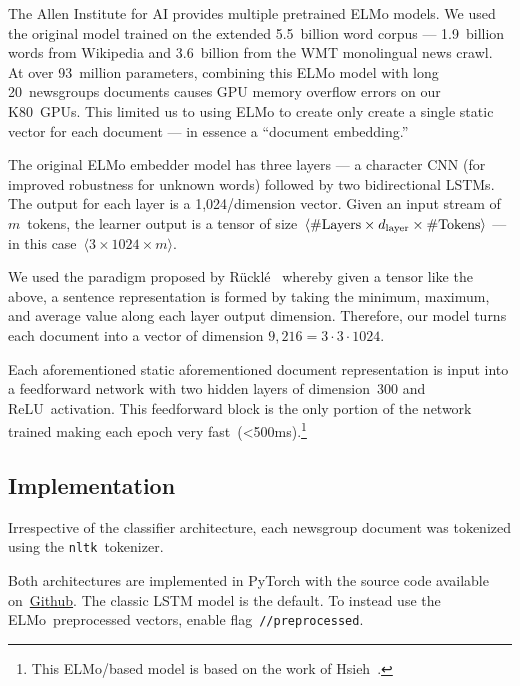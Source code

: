 The Allen Institute for AI provides multiple pretrained ELMo models.  We used the original model trained on the extended 5.5~billion word corpus --- 1.9~billion words from Wikipedia and 3.6~billion from the WMT monolingual news crawl. At over 93~million parameters, combining this ELMo model with long 20~newsgroups documents causes GPU memory overflow errors on our K80~GPUs.  This limited us to using ELMo to create only create a single static vector for each document --- in essence a ``document embedding.''

The original ELMo embedder model has three layers --- a character CNN (for improved robustness for unknown words) followed by two bidirectional LSTMs.  The output for each layer is a 1,024\-/dimension vector.  Given an input stream of $m$~tokens, the learner output is a tensor of size~${\langle \textnormal{\#Layers} \times d_{\textnormal{layer}} \times \textnormal{\#Tokens} \rangle}$ --- in this case~${\langle 3 \times 1024 \times m \rangle}$.

We used the paradigm proposed by R\"{u}ckl\'{e}\etal~\cite{Ruckle:2018} whereby given a tensor like the above, a sentence representation is formed by taking the minimum, maximum, and average value along each layer output dimension. Therefore, our model turns each document into a vector of dimension ${9,216 = 3 \cdot 3 \cdot 1024}$.

Each aforementioned static aforementioned document representation is input into a feedforward network with two hidden layers of dimension~300 and ReLU~activation.  This feedforward block is the only portion of the network trained making each epoch very fast~(<500ms).\footnote{This ELMo\-/based model is based on the work of Hsieh\etal~\cite{Hsieh:2018}.}

\subsection{Implementation}

Irrespective of the classifier architecture, each newsgroup document was tokenized using the \texttt{nltk}~tokenizer.

Both architectures are implemented in PyTorch with the source code available on~\href{\sourceCode}{Github}.  The classic LSTM model is the default. To instead use the ELMo~preprocessed vectors, enable flag~\texttt{\-/\-/preprocessed}.
